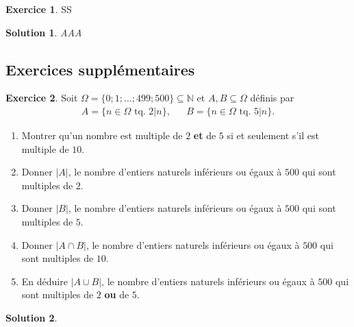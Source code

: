 \documentclass[a4paper, 14pt]{extarticle}
\theoremstyle{plain}
\newtheorem*{sol}{Solution}
\theoremstyle{definition}
\newtheorem{ex}{Exercice}
\newcommand{\N}{\mathbb{N}}
\newif\ifsolutions
\newcommand{\exe}[2]{
		\begin{ex} #1  \end{ex}
		\begin{sol} #2 \end{sol}
	}
\newcommand{\exe}[2]{
		\begin{ex} #1 \end{ex} 
	}
\begin{document}
\pagestyle{fancy}
\fancyhead[C]{\textbf{Probabilités 1 \ifsolutions -- Solutions  \fi}}
\fancyhead[R]{\today}

\exe{
	SS
}
{AAA}


\subsection*{Exercices supplémentaires}

\exe{
	Soit $\Omega = \{ 0 ; 1; \dots ; 499; 500\} \subseteq \N$ et $A, B \subseteq \Omega$ définis par
		\begin{align*}
			A = \{ n \in \Omega \text{ tq. } 2|n \}, && B = \{ n \in \Omega \text{ tq. } 5|n\}.
		\end{align*}
	\begin{enumerate}
		\item
		Montrer qu'un nombre est multiple de $2$ \textbf{et} de $5$ si et seulement s'il est multiple de $10$.
		\item
		Donner $|A|$, le nombre d'entiers naturels inférieurs ou égaux à $500$ qui sont multiples de $2$.
		\item
		Donner $|B|$, le nombre d'entiers naturels inférieurs ou égaux à $500$ qui sont multiples de $5$.
		\item
		Donner $|A \cap B|$, le nombre d'entiers naturels inférieurs ou égaux à $500$ qui sont multiples de $10$.
		\item
		En déduire $|A \cup B|$, le nombre d'entiers naturels inférieurs ou égaux à $500$ qui sont multiples de $2$ \textbf{ou} de $5$.
	\end{enumerate}

}{}
\end{document}
